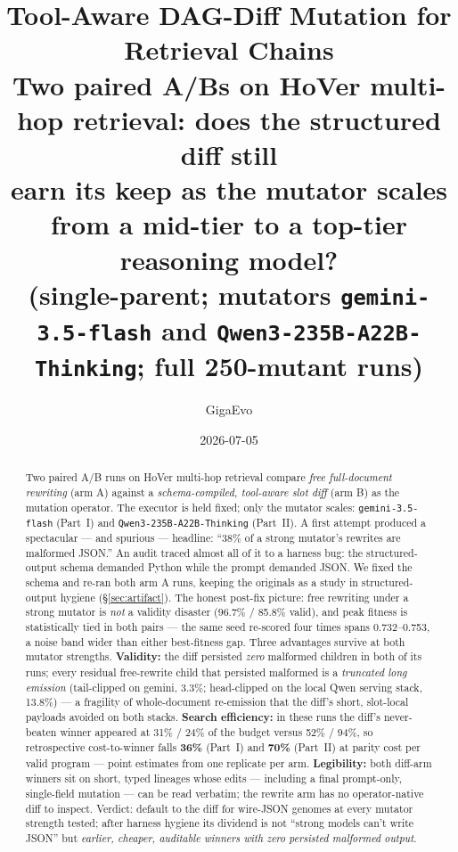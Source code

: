 \documentclass[11pt]{article}
\title{\color{accent}\bfseries Tool-Aware DAG-Diff Mutation for Retrieval Chains\\
\large Two paired A/Bs on HoVer multi-hop retrieval: does the structured diff still\\
earn its keep as the mutator scales from a mid-tier to a top-tier reasoning model?\\
\large (single-parent; mutators \texttt{gemini-3.5-flash} and \texttt{Qwen3-235B-A22B-Thinking}; full 250-mutant runs)}
\author{GigaEvo}
\date{2026-07-05}
\newcommand{\armA}{\textcolor{bad}{arm A}}
\newcommand{\armB}{\textcolor{accent}{arm B}}
\begin{document}
\maketitle

\begin{abstract}
\noindent
Two paired A/B runs on HoVer multi-hop retrieval compare \emph{free full-document rewriting}
(\armA) against a \emph{schema-compiled, tool-aware slot diff} (\armB) as the mutation operator.
The executor is held fixed; only the mutator scales: \texttt{gemini-3.5-flash} (Part~I) and
\texttt{Qwen3-235B-A22B-Thinking} (Part~II). A first attempt produced a spectacular --- and
spurious --- headline: ``38\% of a strong mutator's rewrites are malformed JSON.'' An audit traced
almost all of it to a harness bug: the structured-output schema demanded Python while the prompt
demanded JSON. We fixed the schema and re-ran both \armA{} runs, keeping the originals as a study
in structured-output hygiene (\S\ref{sec:artifact}). The honest post-fix picture: free rewriting
under a strong mutator is \emph{not} a validity disaster (96.7\% / 85.8\% valid), and peak fitness
is statistically tied in both pairs --- the same seed re-scored four times spans 0.732--0.753, a
noise band wider than either best-fitness gap. Three advantages survive at both mutator strengths.
\textbf{Validity:} the diff persisted \emph{zero} malformed children in both of its runs; every
residual free-rewrite child that persisted malformed is a \emph{truncated long emission}
(tail-clipped on gemini, 3.3\%; head-clipped on the local Qwen serving stack, 13.8\%) --- a
fragility of whole-document re-emission that the diff's short, slot-local payloads avoided on
both stacks. \textbf{Search efficiency:} in these runs the diff's never-beaten winner appeared at
31\% / 24\% of the budget versus 52\% / 94\%, so retrospective cost-to-winner falls \textbf{36\%}
(Part~I) and \textbf{70\%} (Part~II) at parity cost per valid program --- point estimates from one
replicate per arm. \textbf{Legibility:} both diff-arm winners sit on short, typed lineages whose
edits --- including a final prompt-only, single-field mutation --- can be read verbatim; the
rewrite arm has no operator-native diff to inspect. Verdict: default to the diff for wire-JSON
genomes at every mutator strength tested; after harness hygiene its dividend is not ``strong
models can't write JSON'' but \emph{earlier, cheaper, auditable winners with zero persisted
malformed output}.
\end{abstract}
\end{document}
